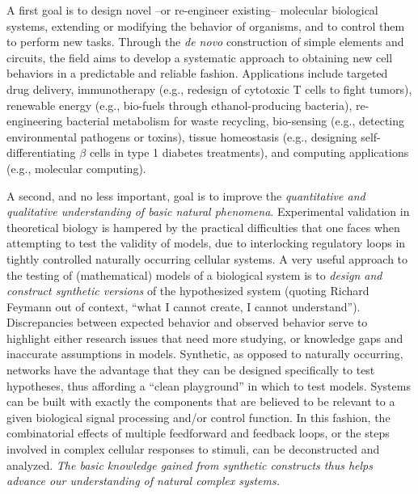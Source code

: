 \documentclass[11pt]{article}
\begin{document}
A first goal is to design novel --or re-engineer existing-- molecular biological
systems, extending or modifying the 
behavior of organisms, and to control them to perform new tasks.
Through the \emph{de novo} construction of simple elements and circuits, the
field aims to develop a systematic approach to obtaining new cell behaviors in
a predictable and reliable fashion.  
Applications include targeted drug delivery, immunotherapy (e.g., redesign of
cytotoxic T cells to fight tumors), renewable energy (e.g., bio-fuels through
ethanol-producing bacteria), re-engineering bacterial metabolism for waste
recycling, bio-sensing (e.g., detecting environmental pathogens or toxins),
tissue homeostasis (e.g., designing self-differentiating $\beta$ cells in type
1 diabetes treatments), and computing applications (e.g., molecular computing).

A second, and no less important, goal is to improve the
\emph{quantitative and qualitative understanding of basic natural phenomena}.
Experimental validation in theoretical biology is hampered by the practical
difficulties that one faces when attempting to test the validity of models, due
to interlocking regulatory loops in tightly controlled naturally occurring
cellular systems. 
A very useful approach to the testing of (mathematical) models of a biological
system is to \emph{design and construct synthetic versions} of the hypothesized
system (quoting Richard Feymann out of context, ``what I cannot create, I
cannot understand'').
Discrepancies between expected behavior and observed behavior serve to
highlight either research issues that need more studying, or knowledge gaps
and inaccurate assumptions in models.
Synthetic, as opposed to naturally occurring, networks have the advantage that
they can be designed specifically to test hypotheses, thus affording a ``clean
playground'' in which to test models. 
Systems can be built with exactly the components that are believed to be
relevant to a given biological signal processing and/or control function.
In this fashion, the combinatorial effects of multiple feedforward and feedback
loops, or the steps involved in complex cellular responses to stimuli, can be
deconstructed and analyzed.
\emph{The basic knowledge gained from synthetic constructs thus helps advance
our understanding of natural complex systems.}
\end{document}
